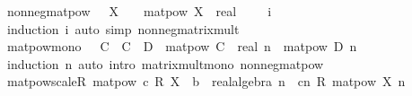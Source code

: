 \begin{isabellebody}
\isanewline
{}\isamarkupfalse%
\ nonneg{\isacharunderscore}{\kern0pt}matpow{\isacharcolon}{\kern0pt}\ {\isachardoublequoteopen}{}\ {\isasymle}\ X\ {\isasymLongrightarrow}\ {}\ {\isasymle}\ matpow\ {\isacharparenleft}{\kern0pt}X\ {\isacharcolon}{\kern0pt}{\isacharcolon}{\kern0pt}\ real\ {\isacharcircum}{\kern0pt}\ {\isacharunderscore}{\kern0pt}\ {\isacharcircum}{\kern0pt}\ {\isacharunderscore}{\kern0pt}{\isacharparenright}{\kern0pt}\ i{\isachardoublequoteclose}\isanewline
%
\isadelimproof
\ \ %
\endisadelimproof
%
\isatagproof
{}\isamarkupfalse%
\ {\isacharparenleft}{\kern0pt}induction\ i{\isacharparenright}{\kern0pt}\ {\isacharparenleft}{\kern0pt}auto\ simp{\isacharcolon}{\kern0pt}\ nonneg{\isacharunderscore}{\kern0pt}matrix{\isacharunderscore}{\kern0pt}mult{\isacharparenright}{\kern0pt}%
\endisatagproof
{\isafoldproof}%
%
\isadelimproof
\isanewline
%
\endisadelimproof
\isanewline
{}\isamarkupfalse%
\ matpow{\isacharunderscore}{\kern0pt}mono{\isacharcolon}{\kern0pt}\ {\isachardoublequoteopen}{}\ {\isasymle}\ C\ {\isasymLongrightarrow}\ C\ {\isasymle}\ D\ {\isasymLongrightarrow}\ matpow\ {\isacharparenleft}{\kern0pt}C\ {\isacharcolon}{\kern0pt}{\isacharcolon}{\kern0pt}\ real{\isacharcircum}{\kern0pt}{\isacharunderscore}{\kern0pt}{\isacharcircum}{\kern0pt}{\isacharunderscore}{\kern0pt}{\isacharparenright}{\kern0pt}\ n\ {\isasymle}\ matpow\ D\ n{\isachardoublequoteclose}\isanewline
%
\isadelimproof
\ \ %
\endisadelimproof
%
\isatagproof
{}\isamarkupfalse%
\ {\isacharparenleft}{\kern0pt}induction\ n{\isacharparenright}{\kern0pt}\ {\isacharparenleft}{\kern0pt}auto\ intro{\isacharbang}{\kern0pt}{\isacharcolon}{\kern0pt}\ matrix{\isacharunderscore}{\kern0pt}mult{\isacharunderscore}{\kern0pt}mono\ nonneg{\isacharunderscore}{\kern0pt}matpow{\isacharparenright}{\kern0pt}%
\endisatagproof
{\isafoldproof}%
%
\isadelimproof
\isanewline
%
\endisadelimproof
\isanewline
{}\isamarkupfalse%
\ matpow{\isacharunderscore}{\kern0pt}scaleR{\isacharcolon}{\kern0pt}\ {\isachardoublequoteopen}matpow\ {\isacharparenleft}{\kern0pt}c\ {\isacharasterisk}{\kern0pt}\isactrlsub R\ {\isacharparenleft}{\kern0pt}X\ {\isacharcolon}{\kern0pt}{\isacharcolon}{\kern0pt}\ {\isacharprime}{\kern0pt}b\ {\isacharcolon}{\kern0pt}{\isacharcolon}{\kern0pt}\ real{\isacharunderscore}{\kern0pt}algebra{\isacharunderscore}{\kern0pt}{}{\isacharcircum}{\kern0pt}{\isacharunderscore}{\kern0pt}{\isacharcircum}{\kern0pt}{\isacharunderscore}{\kern0pt}{\isacharparenright}{\kern0pt}{\isacharparenright}{\kern0pt}\ n\ {\isacharequal}{\kern0pt}\ {\isacharparenleft}{\kern0pt}c{\isacharcircum}{\kern0pt}n{\isacharparenright}{\kern0pt}\ {\isacharasterisk}{\kern0pt}\isactrlsub R\ {\isacharparenleft}{\kern0pt}matpow\ X{\isacharparenright}{\kern0pt}\ n{\isachardoublequoteclose}\isanewline

\end{isabellebody}
